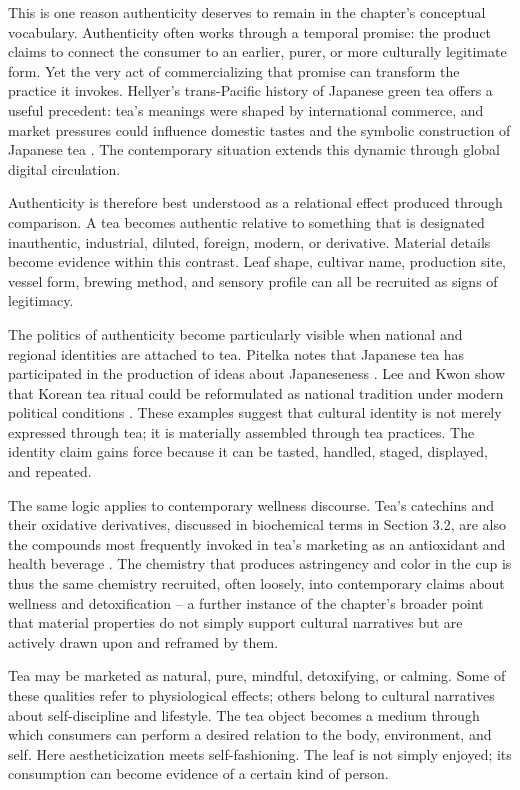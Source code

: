 \documentclass[numbers]{IntechOpen-Book}
\begin{document}
This is one reason authenticity deserves to remain in the chapter's conceptual vocabulary. Authenticity often works through a temporal promise: the product claims to connect the consumer to an earlier, purer, or more culturally legitimate form. Yet the very act of commercializing that promise can transform the practice it invokes. Hellyer's trans-Pacific history of Japanese green tea offers a useful precedent: tea's meanings were shaped by international commerce, and market pressures could influence domestic tastes and the symbolic construction of Japanese tea \cite{hellyer}. The contemporary situation extends this dynamic through global digital circulation.

Authenticity is therefore best understood as a relational effect produced through comparison. A tea becomes authentic relative to something that is designated inauthentic, industrial, diluted, foreign, modern, or derivative. Material details become evidence within this contrast. Leaf shape, cultivar name, production site, vessel form, brewing method, and sensory profile can all be recruited as signs of legitimacy.

The politics of authenticity become particularly visible when national and regional identities are attached to tea. Pitelka notes that Japanese tea has participated in the production of ideas about Japaneseness \cite{pitelka}. Lee and Kwon show that Korean tea ritual could be reformulated as national tradition under modern political conditions \cite{leekwon}. These examples suggest that cultural identity is not merely expressed through tea; it is materially assembled through tea practices. The identity claim gains force because it can be tasted, handled, staged, displayed, and repeated.

The same logic applies to contemporary wellness discourse. Tea's catechins and their oxidative derivatives, discussed in biochemical terms in Section 3.2, are also the compounds most frequently invoked in tea's marketing as an antioxidant and health beverage \cite{sang2011}. The chemistry that produces astringency and color in the cup is thus the same chemistry recruited, often loosely, into contemporary claims about wellness and detoxification -- a further instance of the chapter's broader point that material properties do not simply support cultural narratives but are actively drawn upon and reframed by them.

Tea may be marketed as natural, pure, mindful, detoxifying, or calming. Some of these qualities refer to physiological effects; others belong to cultural narratives about self-discipline and lifestyle. The tea object becomes a medium through which consumers can perform a desired relation to the body, environment, and self. Here aestheticization meets self-fashioning. The leaf is not simply enjoyed; its consumption can become evidence of a certain kind of person.
\end{document}
